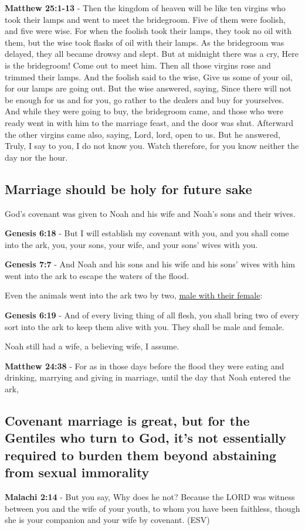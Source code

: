 \documentclass[11pt]{article}
\begin{document}
\textbf{Matthew 25:1-13} - Then the kingdom of heaven will be like ten virgins who took their lamps and went to meet the bridegroom. Five of them were foolish, and five were wise. For when the foolish took their lamps, they took no oil with them, but the wise took flasks of oil with their lamps. As the bridegroom was delayed, they all became drowsy and slept. But at midnight there was a cry, Here is the bridegroom! Come out to meet him. Then all those virgins rose and trimmed their lamps. And the foolish said to the wise, Give us some of your oil, for our lamps are going out. But the wise answered, saying, Since there will not be enough for us and for you, go rather to the dealers and buy for yourselves. And while they were going to buy, the bridegroom came, and those who were ready went in with him to the marriage feast, and the door was shut. Afterward the other virgins came also, saying, Lord, lord, open to us. But he answered, Truly, I say to you, I do not know you. Watch therefore, for you know neither the day nor the hour.

\subsection{Marriage should be holy for future sake}
\label{sec:orgae5bb31}
God's covenant was given to Noah and his wife and Noah's sons and their wives.

\textbf{Genesis 6:18} - But I will establish my covenant with you, and you shall come into the ark, you, your sons, your wife, and your sons' wives with you.

\textbf{Genesis 7:7} - And Noah and his sons and his wife and his sons' wives with him went into the ark to escape the waters of the flood.

Even the animals went into the ark two by two, \uline{male with their female}:

\textbf{Genesis 6:19} - And of every living thing of all flesh, you shall bring two of every sort into the ark to keep them alive with you. They shall be male and female.

Noah still had a wife, a believing wife, I assume.

\textbf{Matthew 24:38} - For as in those days before the flood they were eating and drinking, marrying and giving in marriage, until the day that Noah entered the ark,

\subsection{Covenant marriage is great, but for the Gentiles who turn to God, it's not essentially required to burden them beyond abstaining from sexual immorality}
\label{sec:orgfd2456e}
\textbf{Malachi 2:14} - But you say, Why does he not? Because the LORD was witness between you and the wife of your youth, to whom you have been faithless, though she is your companion and your wife by covenant.  (ESV)
\end{document}
